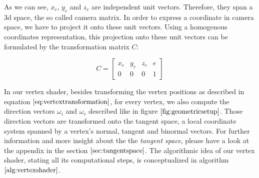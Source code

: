 As we can see, $x_c$, $y_c$ and $z_c$ are independent unit vectors. Therefore, they span a 3d space, the so called camera matrix. In order to express a coordinate in camera space, we have to project it onto these unit vectors. Using a homogenous coordinates representation, this projection onto these unit vectors can be formulated by the transformation matrix $C$:

\begin{equation}
  C = \begin{bmatrix} x_c & y_c & z_c & e \\ 0 & 0 & 0 & 1 \end{bmatrix}
  \label{eq:cameramatrixeq}
\end{equation}

In our vertex shader, besides transforming the vertex positions as described in equation $\ref{eq:vertextransformation}$, for every vertex, we also compute the direction vectors $\omega_i$ and $\omega_r$ described like in figure $\ref{fig:geometricsetup}$. Those direction vectors are transformed onto the tangent space, a local coordinate system spanned by a vertex's normal, tangent and binormal vectors. For further information and more insight about the the \emph{tangent space}, please have a look at the appendix in the section $\ref{sec:tangentspace}$. The algorithmic idea of our vertex shader, stating all its computational steps, is conceptualized in algorithm $\ref{alg:vertexshader}$.

